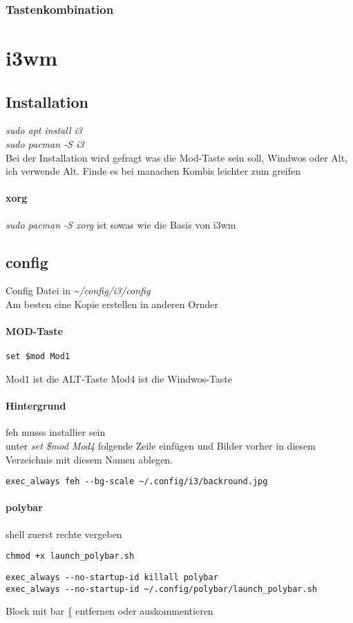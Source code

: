 \documentclass[10pt,a4paper,twoside]{book}
\begin{document}
\subsubsection{Tastenkombination}
\section{i3wm}
\subsection{Installation}
\textit{sudo apt install i3}\\
\textit{sudo pacman -S i3}\\
Bei der Installation wird gefragt was die Mod-Taste sein soll, Windwos oder Alt, ich verwende Alt.
Finde es bei manachen Kombis leichter zum greifen\\
\paragraph{xorg}
\textit{sudo pacman -S xorg} ist sowas wie die Basis von i3wm\\
\subsection{config}
Config Datei in \textit{\textasciitilde /config/i3/config}\\
Am besten eine Kopie erstellen in anderen Ornder\\
\paragraph{MOD-Taste}
\begin{verbatim}
set $mod Mod1
\end{verbatim}
Mod1 ist die ALT-Taste
Mod4 ist die Windwos-Taste
\paragraph{Hintergrund}
feh musss installier sein\\
unter \textit{set \$mod Mod4} folgende Zeile einfügen und Bilder vorher in diesem Verzeichnis mit diesem Namen ablegen.
\begin{verbatim} 
exec_always feh --bg-scale ~/.config/i3/backround.jpg 
\end{verbatim}
\paragraph{polybar}
shell zuerst rechte vergeben\\
\begin{verbatim}
chmod +x launch_polybar.sh
\end{verbatim}
\begin{verbatim}
exec_always --no-startup-id killall polybar
exec_always --no-startup-id ~/.config/polybar/launch_polybar.sh
\end{verbatim}
Block mit bar \{ entfernen oder auskommentieren\\
\end{document}
